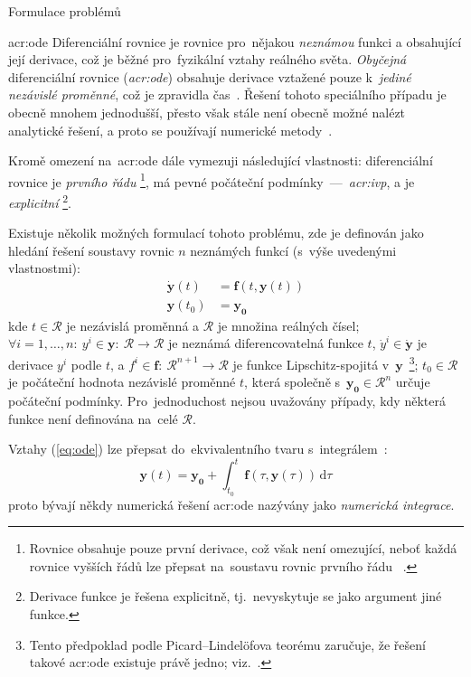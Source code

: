 \documentclass[thesis=M,czech]{FITthesis}[2012/06/26]
\newcommand{\acrlabel}[1]{acr:#1}
\newcommand{\acr}[1]{\acrshort{\acrlabel{#1}}}
\newcommand{\acrf}[1]{\acrfull{\acrlabel{#1}}}
\newcommand{\hl}[1]{\textit{#1}}
\newcommand{\name}[1]{\hl{#1}}
\newcommand{\cit}[1]{\cite{#1}}
\newcommand{\rf}[1]{\ref{#1}}
\newcommand{\rfeq}[1]{(\rf{eq:#1})}
\renewcommand{\vec}[1]{\ensuremath{\boldsymbol{#1}}}
\newcommand{\set}[1]{\ensuremath{\mathcal{#1}}}
\newcommand{\der}[1]{\ensuremath{\dot{#1}}}
\begin{document}
\begin{section}{Formulace problémů}
\begin{subsection}{\acrf{ode}}\label{ss:theory:formulation:ode}
Diferenciální rovnice je rovnice pro~nějakou \hl{neznámou} funkci
a obsahující její derivace,
což je běžné pro~fyzikální vztahy reálného světa.
\hl{Obyčejná} diferenciální rovnice (\name{\acr{ode}})
obsahuje derivace vztažené pouze
k~\hl{jediné nezávislé proměnné},
což je zpravidla čas~\cit{ode}.
Řešení tohoto speciálního případu je obecně mnohem jednodušší,
přesto však stále není obecně možné nalézt analytické řešení,
a proto se používají numerické metody~\cit{odeint-art}.

Kromě omezení na~\acr{ode} dále vymezuji
následující vlastnosti:
diferenciální rovnice je \name{prvního řádu}%
\footnote{Rovnice obsahuje pouze první derivace,
což však není omezující,
neboť každá rovnice vyšších řádů
lze přepsat na~soustavu rovnic prvního řádu%
~\cit{ode-valid-runge_kutta-art}\cit{ode-lec}.},
má pevné počáteční podmínky~---~\name{\acrf{ivp}},
a je \name{explicitní}%
\footnote{Derivace funkce je řešena explicitně,
tj.~nevyskytuje se jako argument jiné funkce.}.

Existuje několik možných formulací tohoto problému,
zde je definován jako hledání řešení soustavy rovnic
$n$ neznámých funkcí
(s~výše uvedenými vlastnostmi):
\begin{equation}\label{eq:ode}
\begin{split}
   \vec{\der{y}}(t) &= \vec{f} \! \left( t, \vec{y}(t) \right) \\
   \vec{y}(t_0)     &= \vec{y_0}
\end{split}
\end{equation}
kde ${t \in \set{R}}$ je nezávislá proměnná a \set{R}
je množina reálných čísel;
${\forall i = 1,} \dots, n : \:
{y^i \in \vec{y}} : \: {\set{R} \rightarrow \set{R}}$
je neznámá diferencovatelná funkce $t$,
${\der{y}^i \in \vec{\der{y}}}$ je derivace $y^i$ podle $t$,
a ${f^i \in \vec{f}} : \: {\set{R}^{n+1} \rightarrow \set{R}}$
je funkce Lipschitz-spojitá v~\vec{y}\,%
\footnote{Tento předpoklad podle Picard--Lindelöfova teorému zaručuje,
že řešení takové \acr{ode} existuje právě jedno; viz.~\cit{ode-lec}.};
${t_0 \in \set{R}}$ je počáteční hodnota nezávislé proměnné $t$,
která společně s~${\vec{y_0} \in \set{R}^{n}}$ určuje počáteční podmínky.
Pro~jednoduchost nejsou uvažovány případy,
kdy některá funkce není definována na~celé \set{R}.

Vztahy \rfeq{ode}
lze přepsat do~ekvivalentního tvaru s~integrálem~\cit{ode-lec}:
\begin{equation}
   \vec{y}(t) = \vec{y_0} + \int_{t_0}^{t} \vec{f} \!
      \left( \tau, \vec{y}(\tau) \right) \, \text{d}\tau
\end{equation}
proto bývají někdy numerická řešení \acr{ode}
nazývány jako \name{numerická integrace}.
\end{subsection} %


\end{section} %
\end{document}
